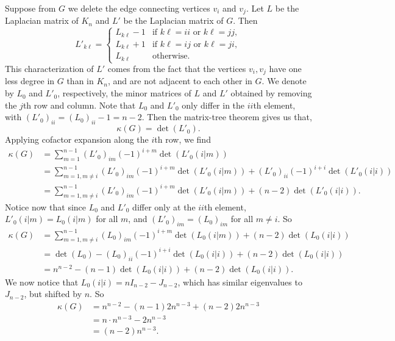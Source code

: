 \documentclass[12pt]{article}
\begin{document}
Suppose from $G$ we delete the edge connecting vertices $v_i$ and $v_j$. Let $L$ be the Laplacian matrix of $K_n$ and $L'$ be the Laplacian matrix of $G$. Then
\[L'_{k\ell} =
    \begin{cases}
        L_{k\ell}-1 &\text{if } k\ell=ii \text{ or } k\ell=jj, \\
        L_{k\ell}+1 &\text{if } k\ell=ij \text{ or } k\ell=ji, \\
        L_{k\ell} &\text{otherwise.}
    \end{cases}
\]
This characterization of $L'$ comes from the fact that the vertices $v_i,v_j$ have one less degree in $G$ than in $K_n$, and are not adjacent to each other in $G$. We denote by $L_0$ and $L'_0$, respectively, the minor matrices of $L$ and $L'$ obtained by removing the $j$th row and column. Note that $L_0$ and $L'_0$ only differ in the $ii$th element, with $(L'_0)_{ii} = (L_0)_{ii}-1 = n-2$. Then the matrix-tree theorem gives us that,
\[\kappa(G) = \det(L'_0).\]
Applying cofactor expansion along the $i$th row, we find
\begin{align*}
    \kappa(G)
        &= \sum_{m=1}^{n-1}(L'_0)_{im}(-1)^{i+m}\det(L'_0(i|m)) \\
        &= \sum_{m=1,m\ne i}^{n-1}(L'_0)_{im}(-1)^{i+m}\det(L'_0(i|m)) + (L'_0)_{ii}(-1)^{i+i}\det(L'_0(i|i))\\
        &= \sum_{m=1,m\ne i}^{n-1}(L'_0)_{im}(-1)^{i+m}\det(L'_0(i|m)) + (n-2)\det(L'_0(i|i)).
\end{align*}
Notice now that since $L_0$ and $L'_0$ differ only at the $ii$th element, $L'_0(i|m)=L_0(i|m)$ for all $m$, and $(L'_0)_{im}=(L_0)_{im}$ for all $m\ne i$. So
\begin{align*}
    \kappa(G)
        &= \sum_{m=1,m\ne i}^{n-1}(L_0)_{im}(-1)^{i+m}\det(L_0(i|m)) + (n-2)\det(L_0(i|i))\\
        &= \det(L_0)-(L_0)_{ii}(-1)^{i+i}\det(L_0(i|i)) + (n-2)\det(L_0(i|i))\\
        &= n^{n-2}-(n-1)\det(L_0(i|i)) + (n-2)\det(L_0(i|i)).
\end{align*}
We now notice that $L_0(i|i)=nI_{n-2}-J_{n-2}$, which has similar eigenvalues to $J_{n-2}$, but shifted by $n$. So
\begin{align*}
    \kappa(G)
        &= n^{n-2}-(n-1)2n^{n-3} + (n-2)2n^{n-3}\\
        &= n\cdot n^{n-3}-2n^{n-3} \\
        &= (n-2)n^{n-3}.
\end{align*}
\end{document}
